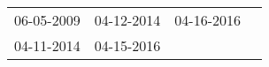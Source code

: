 \begin{supertabular}{llll}
 06-05-2009 &  04-12-2014 &  04-16-2016 \\
 04-11-2014 &  04-15-2016 &             \\
\end{supertabular}
